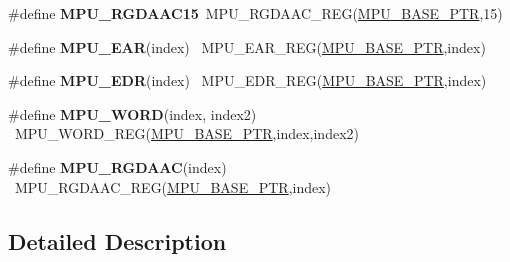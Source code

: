 \begin{DoxyCompactItemize}
\item 
\hypertarget{group___m_p_u___register___accessor___macros_ga0e6236124763a308b5b9f1c40c84ee91}{}\#define {\bfseries M\+P\+U\+\_\+\+R\+G\+D\+A\+A\+C15}~M\+P\+U\+\_\+\+R\+G\+D\+A\+A\+C\+\_\+\+R\+E\+G(\hyperlink{group___m_p_u___peripheral_gae2d60f80178d84225d77e5f0214d1f1d}{M\+P\+U\+\_\+\+B\+A\+S\+E\+\_\+\+P\+T\+R},15)\label{group___m_p_u___register___accessor___macros_ga0e6236124763a308b5b9f1c40c84ee91}

\item 
\hypertarget{group___m_p_u___register___accessor___macros_gaf23e635efc6023dbffa5815bef3b0e97}{}\#define {\bfseries M\+P\+U\+\_\+\+E\+A\+R}(index)                                                  ~M\+P\+U\+\_\+\+E\+A\+R\+\_\+\+R\+E\+G(\hyperlink{group___m_p_u___peripheral_gae2d60f80178d84225d77e5f0214d1f1d}{M\+P\+U\+\_\+\+B\+A\+S\+E\+\_\+\+P\+T\+R},index)\label{group___m_p_u___register___accessor___macros_gaf23e635efc6023dbffa5815bef3b0e97}

\item 
\hypertarget{group___m_p_u___register___accessor___macros_ga50da449922c4ff9bdda167bba9e12498}{}\#define {\bfseries M\+P\+U\+\_\+\+E\+D\+R}(index)                                                  ~M\+P\+U\+\_\+\+E\+D\+R\+\_\+\+R\+E\+G(\hyperlink{group___m_p_u___peripheral_gae2d60f80178d84225d77e5f0214d1f1d}{M\+P\+U\+\_\+\+B\+A\+S\+E\+\_\+\+P\+T\+R},index)\label{group___m_p_u___register___accessor___macros_ga50da449922c4ff9bdda167bba9e12498}

\item 
\hypertarget{group___m_p_u___register___accessor___macros_ga647e834ed4b9989ae28b0d9fc4f99839}{}\#define {\bfseries M\+P\+U\+\_\+\+W\+O\+R\+D}(index,  index2)                                  ~M\+P\+U\+\_\+\+W\+O\+R\+D\+\_\+\+R\+E\+G(\hyperlink{group___m_p_u___peripheral_gae2d60f80178d84225d77e5f0214d1f1d}{M\+P\+U\+\_\+\+B\+A\+S\+E\+\_\+\+P\+T\+R},index,index2)\label{group___m_p_u___register___accessor___macros_ga647e834ed4b9989ae28b0d9fc4f99839}

\item 
\hypertarget{group___m_p_u___register___accessor___macros_ga530fd57aa72634b1863ddf25ea5a1ceb}{}\#define {\bfseries M\+P\+U\+\_\+\+R\+G\+D\+A\+A\+C}(index)                                            ~M\+P\+U\+\_\+\+R\+G\+D\+A\+A\+C\+\_\+\+R\+E\+G(\hyperlink{group___m_p_u___peripheral_gae2d60f80178d84225d77e5f0214d1f1d}{M\+P\+U\+\_\+\+B\+A\+S\+E\+\_\+\+P\+T\+R},index)\label{group___m_p_u___register___accessor___macros_ga530fd57aa72634b1863ddf25ea5a1ceb}

\end{DoxyCompactItemize}


\subsection{Detailed Description}
